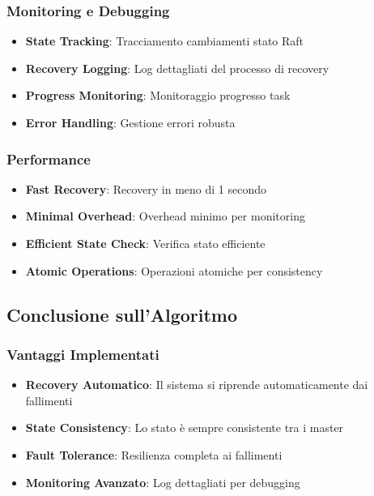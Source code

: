 \documentclass[12pt,a4paper]{article}
\begin{document}
\subsubsection{Monitoring e Debugging}

\begin{itemize}
\item \textbf{State Tracking}: Tracciamento cambiamenti stato Raft
\item \textbf{Recovery Logging}: Log dettagliati del processo di recovery
\item \textbf{Progress Monitoring}: Monitoraggio progresso task
\item \textbf{Error Handling}: Gestione errori robusta
\end{itemize}

\subsubsection{Performance}

\begin{itemize}
\item \textbf{Fast Recovery}: Recovery in meno di 1 secondo
\item \textbf{Minimal Overhead}: Overhead minimo per monitoring
\item \textbf{Efficient State Check}: Verifica stato efficiente
\item \textbf{Atomic Operations}: Operazioni atomiche per consistency
\end{itemize}

\subsection{Conclusione sull'Algoritmo}

\subsubsection{Vantaggi Implementati}

\begin{itemize}
\item \textbf{Recovery Automatico}: Il sistema si riprende automaticamente dai fallimenti
\item \textbf{State Consistency}: Lo stato è sempre consistente tra i master
\item \textbf{Fault Tolerance}: Resilienza completa ai fallimenti
\item \textbf{Monitoring Avanzato}: Log dettagliati per debugging
\end{itemize}
\end{document}
